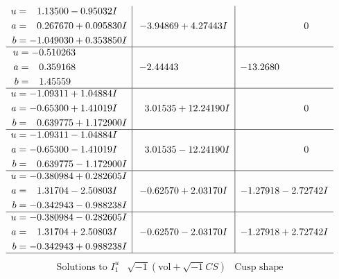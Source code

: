 \documentclass[1p]{elsarticle_modified}
\theoremstyle{definition}
\newcommand{\I}{\sqrt{-1}}
\begin{document}
$$\begin{array}{c|c|c}
\begin{aligned}
u &= \phantom{-}1.13500 - 0.95032 I \\
a &= \phantom{-}0.267670 + 0.095830 I \\
b &= -1.049030 + 0.353850 I\end{aligned}
 & -3.94869 + 4.27443 I & \phantom{-0.000000 } 0 \\ \hline\begin{aligned}
u &= -0.510263\phantom{ +0.000000I} \\
a &= \phantom{-}0.359168\phantom{ +0.000000I} \\
b &= \phantom{-}1.45559\phantom{ +0.000000I}\end{aligned}
 & -2.44443\phantom{ +0.000000I} & -13.2680\phantom{ +0.000000I} \\ \hline\begin{aligned}
u &= -1.09311 + 1.04884 I \\
a &= -0.65300 + 1.41019 I \\
b &= \phantom{-}0.639775 + 1.172900 I\end{aligned}
 & \phantom{-}3.01535 + 12.24190 I & \phantom{-0.000000 } 0 \\ \hline\begin{aligned}
u &= -1.09311 - 1.04884 I \\
a &= -0.65300 - 1.41019 I \\
b &= \phantom{-}0.639775 - 1.172900 I\end{aligned}
 & \phantom{-}3.01535 - 12.24190 I & \phantom{-0.000000 } 0 \\ \hline\begin{aligned}
u &= -0.380984 + 0.282605 I \\
a &= \phantom{-}1.31704 - 2.50803 I \\
b &= -0.342943 - 0.988238 I\end{aligned}
 & -0.62570 + 2.03170 I & -1.27918 - 2.72742 I \\ \hline\begin{aligned}
u &= -0.380984 - 0.282605 I \\
a &= \phantom{-}1.31704 + 2.50803 I \\
b &= -0.342943 + 0.988238 I\end{aligned}
 & -0.62570 - 2.03170 I & -1.27918 + 2.72742 I\\
 \hline 
 \end{array}$$\newpage$$\begin{array}{c|c|c}  
\text{Solutions to }I^u_{1}& \I (\text{vol} + \sqrt{-1}CS) & \text{Cusp shape}\\
 \hline 
\begin{aligned}

\end{aligned}
\end{array}$$
\end{document}
